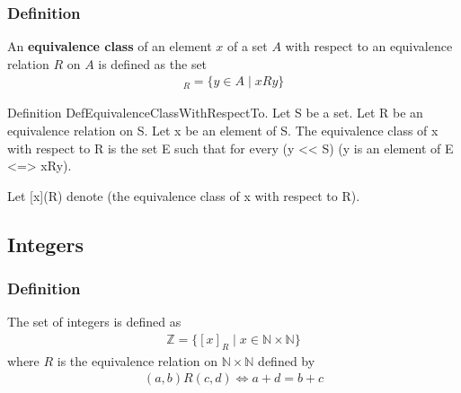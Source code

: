 \subsubsection{Definition}
\begin{true}
An \textbf{equivalence class} of an element $x$ of a set $A$ with respect to an equivalence relation $R$ on $A$ is defined as the set
\begin{align*}
    [x]_R = \{y \in A \mid xRy\}
\end{align*}
\end{true}
\begin{forthel}
Definition DefEquivalenceClassWithRespectTo.
    Let S be a set.
    Let R be an equivalence relation on S.
    Let x be an element of S.
    The equivalence class of x with respect to R is the set E
    such that for every (y << S) (y is an element of E <=> xRy).

Let [x](R) denote (the equivalence class of x with respect to R).
\end{forthel}

\subsection{Integers}

\subsubsection{Definition}
\begin{true}
The set of integers is defined as
\begin{align*}
    \mathbb{Z} = \{ [x]_R \mid x \in \mathbb{N} \times \mathbb{N} \}
\end{align*}
where $R$ is the equivalence relation on $\mathbb{N} \times \mathbb{N}$ defined by
\begin{align*}
    (a,b)R(c,d) \iff a + d = b + c
\end{align*}
\end{true}
\begin{forthel}

\end{forthel}
